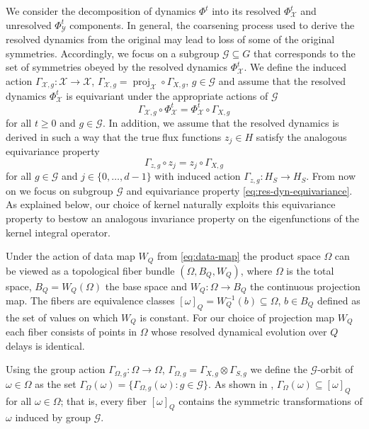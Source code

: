 \documentclass[letterpaper,10pt,3p,preprint]{elsarticle}
\newcommand{\Xcal}{\mathcal{X}}
\newcommand{\Ycal}{\mathcal{Y}}
\newcommand{\Gcal}{\mathcal{G}}
\DeclareMathOperator{\proj}{proj}
\begin{document}
We consider the decomposition of dynamics
$\Phi^t$ into its resolved $\Phi_\Xcal^t$ and unresolved
$\Phi_\Ycal^t$ components.
In general, the coarsening process used to derive the resolved
dynamics from the original may lead to loss of some of the
original symmetries.
Accordingly, we focus on a subgroup $\Gcal\subseteq G$
that corresponds to the set of symmetries obeyed by the
resolved dynamics $\Phi_\Xcal^t$.
We define the induced action
$\Gamma_{\Xcal,g}\colon\Xcal\rightarrow \Xcal$,
$\Gamma_{\Xcal,g}=\proj_\Xcal\circ\Gamma_{X,g}$, $g\in \Gcal$
and assume that the resolved dynamics $\Phi_\Xcal^t$
is equivariant under the appropriate actions of $\Gcal$
\begin{equation}\label{eq:res-dyn-equivariance}
    \Gamma_{\Xcal,g}\circ\Phi_\Xcal^t=\Phi_\Xcal^t\circ\Gamma_{X,g}
\end{equation}
for all $t\geq 0$ and $g\in \Gcal$.
In addition, we assume that the resolved dynamics is derived
in such a way that the true flux functions $z_j\in H$ satisfy the
analogous equivariance property
\begin{equation*}
    \Gamma_{z,g}\circ z_j=z_j\circ\Gamma_{X,g}
\end{equation*}
for all $g\in\Gcal$ and $j\in\{0,\ldots,d-1\}$
with induced action
$\Gamma_{z,g}\colon H_S\to H_S$.
From now on we focus on subgroup $\Gcal$ and equivariance property
\eqref{eq:res-dyn-equivariance}.
As explained below, our choice of kernel naturally exploits this equivariance
property to bestow an analogous invariance property on the eigenfunctions of
the kernel integral operator.

Under the action of data map $W_Q$ from \eqref{eq:data-map}
the product space $\Omega$ can be viewed as a topological fiber
bundle $(\Omega,B_Q,W_Q)$,
where $\Omega$ is the total space,
$B_Q=W_Q(\Omega)$ the base space and
$W_Q\colon\Omega\rightarrow B_Q$ the continuous projection map.
The fibers are equivalence classes
$[\omega]_Q=W_Q^{-1}(b)\subseteq\Omega$, $b\in B_Q$
defined as the set of values on which $W_Q$ is constant.
For our choice of projection map $W_Q$ each fiber consists of
points in $\Omega$ whose resolved dynamical evolution over $Q$
delays is identical.

Using the group action
$\Gamma_{\Omega,g}\colon\Omega\rightarrow\Omega$,
$\Gamma_{\Omega,g}=\Gamma_{X,g}\otimes\Gamma_{S,g}$
we define the $\Gcal$-orbit of $\omega\in\Omega$ as the set
$\Gamma_\Omega(\omega)=\{\Gamma_{\Omega,g}(\omega)\colon g\in \Gcal\}$.
As shown in \cite{Giannakis2019vsa},
$\Gamma_\Omega(\omega)\subseteq [\omega]_Q$ for all $\omega\in\Omega$;
that is, every fiber $[\omega]_Q$ contains the symmetric transformations
of $\omega$ induced by group $\Gcal$.
\end{document}
